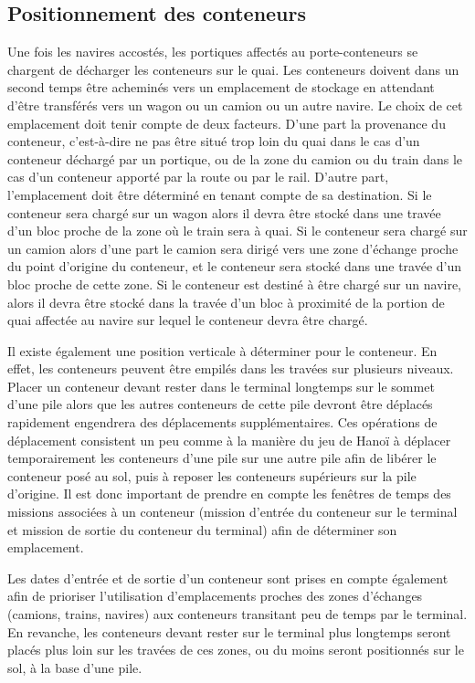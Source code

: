 
\subsection{Positionnement des conteneurs}	%

Une fois les navires accostés, les portiques affectés au porte-conteneurs se chargent de décharger les conteneurs sur le quai. 
Les conteneurs doivent dans un second temps être acheminés vers un emplacement de stockage en attendant d'être transférés vers un wagon ou un camion ou un autre navire. 
Le choix de cet emplacement doit tenir compte de deux facteurs. D'une part la provenance du conteneur, c'est-à-dire ne pas être situé trop loin du quai dans le cas d'un conteneur déchargé par un portique, ou de la zone du camion ou du train dans le cas d'un conteneur apporté par la route ou par le rail. D'autre part, l'emplacement doit être déterminé en tenant compte de sa destination. Si le conteneur sera chargé sur un wagon alors il devra être stocké dans une travée d'un bloc proche de la zone où le train sera à quai. Si le conteneur sera chargé sur un camion alors d'une part le camion sera dirigé vers une zone d'échange proche du point d'origine du conteneur, et le conteneur sera stocké dans une travée d'un bloc proche de cette zone. Si le conteneur est destiné à être chargé sur un navire, alors il devra être stocké dans la travée d'un bloc à proximité de la portion de quai affectée au navire sur lequel le conteneur devra être chargé.

Il existe également une position verticale à déterminer pour le conteneur. En effet, les conteneurs peuvent être empilés dans les travées sur plusieurs niveaux. Placer un conteneur devant rester dans le terminal longtemps sur le sommet d'une pile alors que les autres conteneurs de cette pile devront être déplacés rapidement engendrera des déplacements supplémentaires. Ces opérations de déplacement consistent un peu comme à la manière du jeu de Hanoï à déplacer temporairement les conteneurs d'une pile sur une autre pile afin de libérer le conteneur posé au sol, puis à reposer les conteneurs supérieurs sur la pile d'origine.
Il est donc important de prendre en compte les fenêtres de temps des missions associées à un conteneur (mission d'entrée du conteneur sur le terminal et mission de sortie du conteneur du terminal) afin de déterminer son emplacement.

Les dates d'entrée et de sortie d'un conteneur sont prises en compte également afin de prioriser l'utilisation d'emplacements proches des zones d'échanges (camions, trains, navires) aux conteneurs transitant peu de temps par le terminal. En revanche, les conteneurs devant rester sur le terminal plus longtemps seront placés plus loin sur les travées de ces zones, ou du moins seront positionnés sur le sol, à la base d'une pile.

